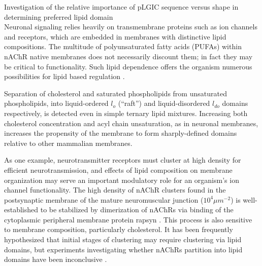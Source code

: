 \documentclass{article}
\begin{document}
Investigation of the relative importance of pLGIC sequence versus shape in determining preferred lipid domain\\%

Neuronal signaling relies heavily on transmembrane proteins such as ion channels and receptors, which are embedded in membranes with distinctive lipid compositions. The multitude of polyunsaturated fatty acids (PUFAs) within nAChR native membranes does not necessarily discount them; in fact they may be critical to functionality. Such lipid dependence offers the organism numerous possibilities for lipid based regulation \cite{Lennon2003}.


Separation of cholesterol and saturated phospholipids from unsaturated phospholipids, into liquid-ordered $l_o$ (“raft”) and liquid-disordered $l_{do}$ domains respectively, is detected even in simple ternary lipid mixtures. Increasing both cholesterol concentration and acyl chain unsaturation, as in neuronal membranes, increases the propensity of the membrane to form sharply-defined domains relative to other mammalian membranes.

As one example, neurotransmitter receptors must cluster at high density for efficient neurotransmission, and effects of lipid composition on membrane organization may serve an important modulatory role for an organism's ion channel functionality. The high density of nAChR clusters found in the postsynaptic membrane of the mature neuromuscular junction ($10^4$$\mu m^{-2}$) is well-established to be stabilized by dimerization of nAChRs via binding of the cytoplasmic peripheral membrane protein rapsyn \cite{Zuber_Structure_2013}. This process is also sensitive to membrane composition, particularly cholesterol. It has been frequently hypothesized \cite{Zhu2006,Bruses2001} that initial stages of clustering may require clustering via lipid domains, but experiments investigating whether nAChRs partition into lipid domains have been inconclusive \cite{Bermdez_Partition_2010,Perillo2016}.
\end{document}
